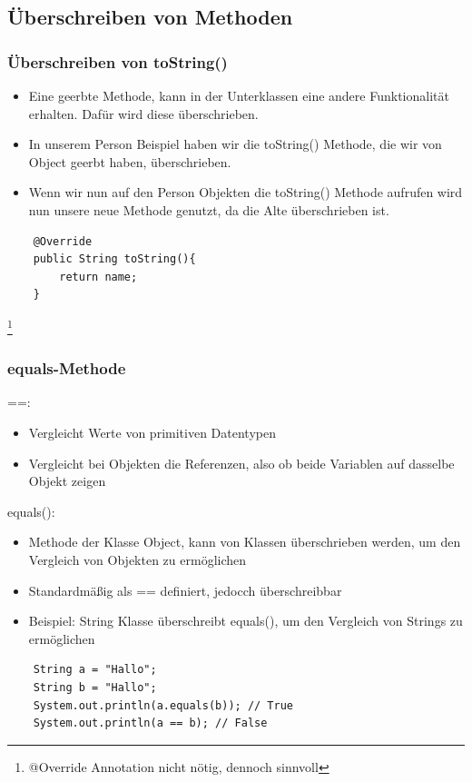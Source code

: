 \subsection{Überschreiben von Methoden}
\begin{frame}[fragile]
\frametitle{Überschreiben von toString()}
\begin{itemize}
\item Eine geerbte Methode, kann in der Unterklassen eine andere Funktionalität erhalten. Dafür wird diese überschrieben.
\item In unserem Person Beispiel haben wir die toString() Methode, die wir von Object geerbt haben, überschrieben. 
\item Wenn wir nun auf den Person Objekten die toString() Methode aufrufen wird nun unsere neue Methode genutzt, da die Alte überschrieben ist.
\end{itemize}
\begin{lstlisting}
    @Override
    public String toString(){
        return name;
    }
\end{lstlisting}
\footnote{@Override Annotation nicht nötig, dennoch sinnvoll}
\end{frame}

\begin{frame}[fragile]
\frametitle{equals-Methode}
==:
\begin{itemize} 
\item Vergleicht Werte von primitiven Datentypen
\item Vergleicht bei Objekten die Referenzen, also ob beide Variablen auf dasselbe Objekt zeigen
\end{itemize}


equals(): 
\begin{itemize}
\item Methode der Klasse Object, kann von Klassen überschrieben werden, um den Vergleich von Objekten zu ermöglichen
          
\item Standardmäßig als == definiert, jedocch überschreibbar
          
\item Beispiel: String Klasse überschreibt equals(), um den Vergleich von Strings zu ermöglichen
\end{itemize}
\begin{lstlisting}
    String a = "Hallo";
    String b = "Hallo";
    System.out.println(a.equals(b)); // True
    System.out.println(a == b); // False
\end{lstlisting}
\end{frame}

